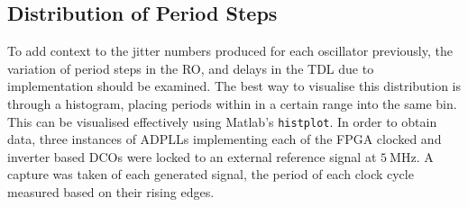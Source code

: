 \subsection{Distribution of Period Steps}
To add context to the jitter numbers produced for each oscillator previously, the variation of period steps in the \ac{RO}, and delays in the \ac{TDL} due to implementation should be examined. The best way to visualise this distribution is through a histogram, placing periods within in a certain range into the same bin. This can be visualised effectively using Matlab's \texttt{histplot}. In order to obtain data, three instances of \acp{ADPLL} implementing each of the \ac{FPGA} clocked and inverter based \acp{DCO} were locked to an external reference signal at $5~\si{\mega\hertz}$. A capture was taken of each generated signal, the period of each clock cycle measured based on their rising edges.

